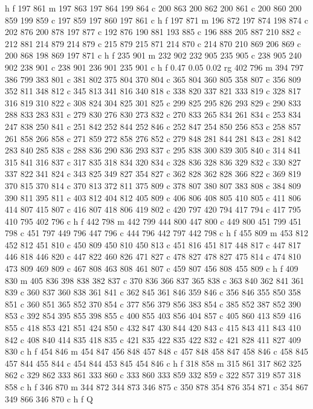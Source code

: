 {{   h f
   197 861 m
   197 863 197 864 199 864 c
   200 863 200 862 200 861 c
   200 860 200 859 199 859 c
   197 859 197 860 197 861 c
   h f
   197 871 m
   196 872 197 874 198 874 c
   202 876 200 878 197 877 c
   192 876 190 881 193 885 c
   196 888 205 887 210 882 c
   212 881 214 879 214 879 c
   215 879 215 871 214 870 c
   214 870 210 869 206 869 c
   200 868 198 869 197 871 c
   h f
   235 901 m
   232 902 232 905 235 905 c
   238 905 240 902 238 901 c
   238 901 236 901 235 901 c
   h f
   0.47 0.05 0.02 rg
   402 796 m
   394 797 386 799 383 801 c
   381 802 375 804 370 804 c
   365 804 360 805 358 807 c
   356 809 352 811 348 812 c
   345 813 341 816 340 818 c
   338 820 337 821 333 819 c
   328 817 316 819 310 822 c
   308 824 304 825 301 825 c
   299 825 295 826 293 829 c
   290 833 288 833 283 831 c
   279 830 276 830 273 832 c
   270 833 265 834 261 834 c
   253 834 247 838 250 841 c
   251 842 252 844 252 846 c
   252 847 254 850 256 853 c
   258 857 261 858 266 858 c
   271 859 272 858 276 852 c
   279 848 281 844 281 843 c
   281 842 283 840 285 838 c
   288 836 290 836 293 837 c
   295 838 300 839 305 840 c
   314 841 315 841 316 837 c
   317 835 318 834 320 834 c
   328 836 328 836 329 832 c
   330 827 337 822 341 824 c
   343 825 349 827 354 827 c
   362 828 362 828 366 822 c
   369 819 370 815 370 814 c
   370 813 372 811 375 809 c
   378 807 380 807 383 808 c
   384 809 390 811 395 811 c
   403 812 404 812 405 809 c
   406 806 408 805 410 805 c
   411 806 414 807 415 807 c
   416 807 418 806 419 802 c
   420 797 420 794 417 794 c
   417 795 410 795 402 796 c
   h f
   442 798 m
   442 799 444 800 447 800 c
   449 800 451 799 451 798 c
   451 797 449 796 447 796 c
   444 796 442 797 442 798 c
   h f
   455 809 m
   453 812 452 812 451 810 c
   450 809 450 810 450 813 c
   451 816 451 817 448 817 c
   447 817 446 818 446 820 c
   447 822 460 826 471 827 c
   478 827 478 827 475 814 c
   474 810 473 809 469 809 c
   467 808 463 808 461 807 c
   459 807 456 808 455 809 c
   h f
   409 830 m
   405 836 398 838 382 837 c
   370 836 366 837 365 838 c
   363 840 362 841 361 839 c
   360 837 360 838 361 841 c
   362 845 361 846 359 846 c
   356 846 355 850 358 851 c
   360 851 365 852 370 854 c
   377 856 379 856 383 854 c
   385 852 387 852 390 853 c
   392 854 395 855 398 855 c
   400 855 403 856 404 857 c
   405 860 413 859 416 855 c
   418 853 421 851 424 850 c
   432 847 430 844 420 843 c
   415 843 411 843 410 842 c
   408 840 414 835 418 835 c
   421 835 422 835 422 832 c
   421 828 411 827 409 830 c
   h f
   454 846 m
   454 847 456 848 457 848 c
   457 848 458 847 458 846 c
   458 845 457 844 455 844 c
   454 844 453 845 454 846 c
   h f
   318 858 m
   315 861 317 862 325 862 c
   329 862 333 861 333 860 c
   333 860 333 859 332 859 c
   322 857 319 857 318 858 c
   h f
   346 870 m
   344 872 344 873 346 875 c
   350 878 354 876 354 871 c
   354 867 349 866 346 870 c
   h f
   Q
}}
